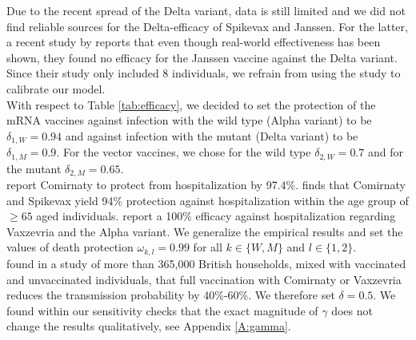 Due to the recent spread of the Delta variant, data is still limited and we did not find reliable sources for the Delta-efficacy of Spikevax and Janssen. For the latter, a recent study by \cite{Jongeneelen.2021} reports that even though real-world effectiveness has been shown, they found no efficacy for the Janssen vaccine against the Delta variant. Since their study only included 8 individuals, we refrain from using the study to calibrate our model. \\

With respect to Table \ref{tab:efficacy}, we decided to set the protection of the mRNA vaccines against infection with the wild type (Alpha variant) to be $\delta_{1, W} = 0.94$ and against infection with the mutant (Delta variant) to be $\delta_{1, M} = 0.9$. For the vector vaccines, we chose for the wild type $\delta_{2, W} = 0.7$ and for the mutant $\delta_{2, M} = 0.65$.\\

\cite{Abu.2021} report Comirnaty to protect from hospitalization by 97.4\%. \cite{Tenforde.2021} finds that Comirnaty and Spikevax yield 94\% protection against hospitalization within the age group of $\geq 65$ aged individuals. \cite{Voysey.2021} report a 100\% efficacy against hospitalization regarding Vaxzevria and the Alpha variant. We generalize the empirical results and set the values of death protection $\omega_{k,l} = 0.99$ for all $k \in \{W,M\}$ and $l \in \{1,2\}$.\\

\cite{Harris.2021} found in a study of more than 365,000 British households, mixed with vaccinated and unvaccinated individuals, that full vaccination with Comirnaty or Vaxzevria reduces the transmission probability by 40\%-60\%. We therefore set $\delta = 0.5$. We found within our sensitivity checks that the exact magnitude of $\gamma$ does not change the results qualitatively, see Appendix \ref{A:gamma}. \\

